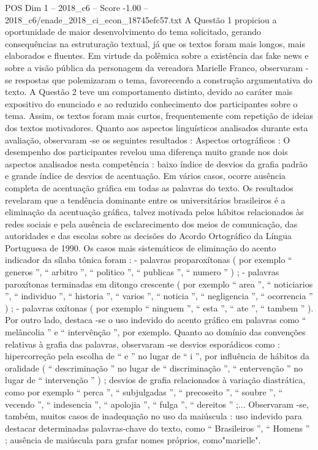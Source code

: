 \begin{textsample}{POS Dim 1 – 2018\_c6 – Score -1.00 – 2018\_c6/enade\_2018\_ci\_econ\_18745efc57.txt}
A Questão 1 propiciou a oportunidade de maior desenvolvimento do tema solicitado, gerando consequências na estruturação textual, já que os textos foram mais longos, mais elaborados e fluentes.
Em virtude da polêmica sobre a existência das fake news e sobre a visão pública da personagem da vereadora Marielle Franco, observaram -se respostas que polemizaram o tema, favorecendo a construção argumentativa do texto.
A Questão 2 teve um comportamento distinto, devido ao caráter mais expositivo do enunciado e ao reduzido conhecimento dos participantes sobre o tema.
Assim, os textos foram mais curtos, frequentemente com repetição de ideias dos textos motivadores.
Quanto aos aspectos linguísticos analisados durante esta avaliação, observaram -se os seguintes resultados : Aspectos ortográficos : O desempenho dos participantes revelou uma diferença muito grande nos dois aspectos analisados nesta competência : baixo índice de desvios da grafia padrão e grande índice de desvios de acentuação.
Em vários casos, ocorre ausência completa de acentuação gráfica em todas as palavras do texto.
Os resultados revelaram que a tendência dominante entre os universitários brasileiros é a eliminação da acentuação gráfica, talvez motivada pelos hábitos relacionados às redes sociais e pela ausência de esclarecimento dos meios de comunicação, das autoridades e das escolas sobre as decisões do Acordo Ortográfico da Língua Portuguesa de 1990.
Os casos mais sistemáticos de eliminação do acento indicador da sílaba tônica foram : - palavras proparoxítonas ( por exemplo “ generos ”, “ arbitro ”, “ politico ”, “ publicas ”, “ numero ” ) ; - palavras paroxítonas terminadas em ditongo crescente ( por exemplo “ area ”, “ noticiarios ”, “ individuo ”, “ historia ”, “ varios ”, “ noticia ”, “ negligencia ”, “ ocorrencia ” ) ; - palavras oxítonas ( por exemplo “ ninguem ”, “ esta ”, “ ate ”, “ tambem ” ).
Por outro lado, destaca -se o uso indevido do acento gráfico em palavras como “ melâncolia ” e “ intervênção ”, por exemplo.
Quanto ao domínio das convenções relativas à grafia das palavras, observaram -se desvios esporádicos como : hipercorreção pela escolha de “ e ” no lugar de “ i ”, por influência de hábitos da oralidade ( “ descriminação ” no lugar de “ discriminação ”, “ entervenção ” no lugar de “ intervenção ” ) ; desvios de grafia relacionados à variação diastrática, como por exemplo “ perca ”, “ subjulgadas ”, “ precoseito ”, “ soubre ”, “ vecendo ”, “ indesencia ”, “ apolojia ”, “ fulga ”, “ dereitos ” ;...
Observaram -se, também, muitos casos de inadequação no uso da maiúscula : uso indevido para destacar determinadas palavras-chave do texto, como “ Brasileiros ”, “ Homens ” ; ausência de maiúscula para grafar nomes próprios, como"marielle".

\end{textsample}
